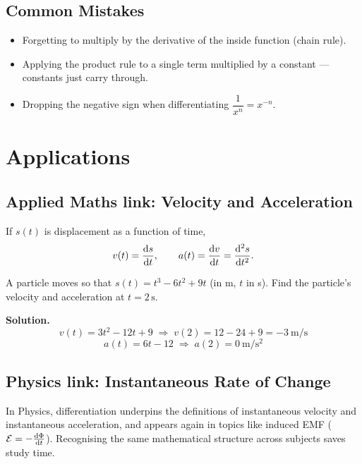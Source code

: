 \documentclass[11pt]{article}
\begin{document}
\subsection{Common Mistakes}
\begin{itemize}
  \item Forgetting to multiply by the derivative of the inside function (chain rule).
  \item Applying the product rule to a single term multiplied by a constant --- constants just carry through.
  \item Dropping the negative sign when differentiating $\dfrac{1}{x^n} = x^{-n}$.
\end{itemize}

\section{Applications}

\subsection{Applied Maths link: Velocity and Acceleration}

\begin{ldmdefinition}
If $s(t)$ is displacement as a function of time,
\[
  v(t) = \dv{s}{t}, \qquad a(t) = \dv{v}{t} = \dv[2]{s}{t}.
\]
\end{ldmdefinition}

\begin{ldmexample}
A particle moves so that $s(t) = t^3 - 6t^2 + 9t$ (in \unit{\metre}, $t$ in \unit{\second}).
Find the particle's velocity and acceleration at $t = 2\,\unit{\second}$.

\textbf{Solution.}
\[
  v(t) = 3t^2 - 12t + 9 \;\Rightarrow\; v(2) = 12 - 24 + 9 = -3\ \unit{\metre\per\second}
\]
\[
  a(t) = 6t - 12 \;\Rightarrow\; a(2) = 0\ \unit{\metre\per\second\squared}
\]
\end{ldmexample}

\subsection{Physics link: Instantaneous Rate of Change}

\begin{ldmexamtip}
In Physics, differentiation underpins the definitions of instantaneous
velocity and instantaneous acceleration, and appears again in topics
like induced EMF ($\mathcal{E} = -\dv{\Phi}{t}$). Recognising the same
mathematical structure across subjects saves study time.
\end{ldmexamtip}
\end{document}
